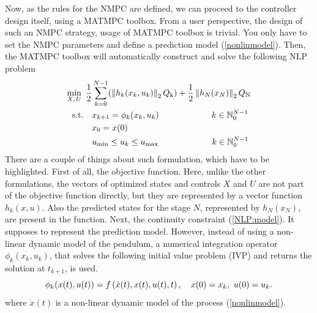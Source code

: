 Now, as the rules for the NMPC are defined, we can proceed to the controller design itself, using a \textsc{MATMPC} toolbox. From a user perspective, the design of such an NMPC strategy, usage of \textsc{MATMPC} toolbox is trivial. You only have to set the NMPC parameters and define a prediction model (\ref{nonlinmodel}). Then, the \textsc{MATMPC} toolbox will automatically construct and solve the following NLP problem
\begin{subequations}\label{NLP}
	\begin{align}
	\min_{X,\,U}\ \frac{1}{2}&\sum_{k=0}^{N-1} (\left\| h_k(x_k, u_k)\right\|_2Q _{\text{k}}) + \frac{1}{2}\left\|h_N(x_N)\right\|_2Q _{\text{N}}\label{NLP:obj}\\
	\text{s.t.}\quad &x_{k+1} = \phi_k(x_{k},u_{k})\qquad\qquad\qquad\, k \in \mathbb{N}_0^{N-1}\label{NLP:model}\\
	&x_0 = x(0)\\
	&u _{\text{min}}\leq u_{k}\leq u _{\text{max}}\qquad\qquad\qquad\;   k \in \mathbb{N}_0^{N-1}	
	\end{align}
\end{subequations}
There are a couple of things about such formulation, which have to be highlighted. First of all, the objective function. Here, unlike the other formulations, the vectors of optimized states and controls $X$ and $U$ are not part of the objective function directly, but they are represented by a vector function $h_k(x, u)$. Also the predicted states for the stage $N$, represented by $h_N(x_N)$, are present in the function. Next, the continuity constraint (\ref{NLP:model}). It supposes to represent the prediction model. However, instead of using a non-linear dynamic model of the pendulum,  a numerical integration operator $\phi_k(x_{k},u_{k})$, that solves the following initial value problem (IVP) and returns the solution at $t_{k+1}$, is used. 
\begin{equation}
\phi_k(x(t),u(t))=f\left( \dot{x}(t), x(t),u(t),t \right),\quad x(0)=x_k,\ u(0)=u_k.
\end{equation}
where $\dot{x}(t)$ is a non-linear dynamic model of the process (\ref{nonlinmodel}).

